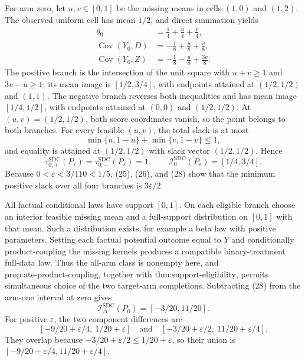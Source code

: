 For arm zero, let \(u,v\in[0,1]\) be the missing means in cells \((1,0)\) and \((1,2)\).  The observed uniform cell has mean \(1/2\), and direct summation yields
\[
 \begin{aligned}
 \theta_0&=\frac14+\frac{u}{4}+\frac{v}{4},\\
 \operatorname{Cov}(Y_0,D)&=-\frac18+\frac{u}{8}+\frac{v}{8},\\
 \operatorname{Cov}(Y_0,Z)&=-\frac18-\frac{u}{8}+\frac{3v}{8}.
 \end{aligned}                                                    \tag{27}
\]
The positive branch is the intersection of the unit square with \(u+v\ge1\) and \(3v-u\ge1\); its mean image is \([1/2,3/4]\), with endpoints attained at \((1/2,1/2)\) and \((1,1)\).  The negative branch reverses both inequalities and has mean image \([1/4,1/2]\), with endpoints attained at \((0,0)\) and \((1/2,1/2)\).  At \((u,v)=(1/2,1/2)\), both score coordinates vanish, so the point belongs to both branches.  For every feasible \((u,v)\), the total slack is at most
\[
 \min\{u,1-u\}+\min\{v,1-v\}\le1,
\]
and equality is attained at \((1/2,1/2)\) with slack vector \((1/2,1/2)\).  Hence
\[
 \tau_{0,+}^{\mathrm{SDC}}(P_\varepsilon)
 =\tau_{0,-}^{\mathrm{SDC}}(P_\varepsilon)=1,
 \qquad
 \mathcal I_0^{\mathrm{SDC}}(P_\varepsilon)=[1/4,3/4].           \tag{28}
\]
Because \(0<\varepsilon<3/110<1/5\), (25), (26), and (28) show that the minimum positive slack over all four branches is \(3\varepsilon/2\).

All factual conditional laws have support \([0,1]\).  On each eligible branch choose an interior feasible missing mean and a full-support distribution on \([0,1]\) with that mean.  Such a distribution exists, for example a beta law with positive parameters.  Setting each factual potential outcome equal to \(Y\) and conditionally product-coupling the missing kernels produces a compatible binary-treatment full-data law.  Thus the all-arm class is nonempty here, and \(\text{prop:ate-product-coupling}\), together with \(\text{thm:support-eligibility}\), permits simultaneous choice of the two target-arm completions.  Subtracting (28) from the arm-one interval at zero gives
\[
 \mathcal I_\Delta^{\mathrm{SDC}}(P_0)=[-3/20,11/20].             \tag{29}
\]
For positive \(\varepsilon\), the two component differences are
\[
 [-9/20+\varepsilon/4,\ 1/20+\varepsilon]
 \quad\text{and}\quad
 [-3/20+\varepsilon/2,\ 11/20+\varepsilon/4].                    \tag{30}
\]
They overlap because \(-3/20+\varepsilon/2\le1/20+\varepsilon\), so their union is \([-9/20+\varepsilon/4,11/20+\varepsilon/4]\).

